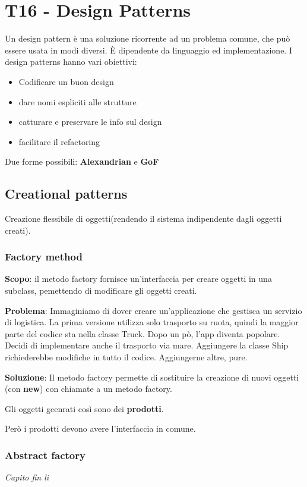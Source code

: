 \documentclass{article}
\begin{document}
\section{T16 - Design Patterns}

Un design pattern è una soluzione ricorrente ad un problema comune, che può essere usata
in modi diversi. È dipendente da linguaggio ed implementazione. I design patterns hanno vari obiettivi:
\begin{itemize}
    \item Codificare un buon design
    \item dare nomi espliciti alle strutture
    \item catturare e preservare le info sul design
    \item facilitare il refactoring
\end{itemize}

Due forme possibili: \textbf{Alexandrian} e \textbf{GoF}
\subsection{Creational patterns}
Creazione flessibile di oggetti(rendendo il sistema indipendente dagli oggetti creati).

\subsubsection{Factory method}
\textbf{Scopo}: il metodo factory fornisce un'interfaccia per creare oggetti
in una subclass, pemettendo di modificare gli oggetti creati.

\textbf{Problema}: Immaginiamo di dover creare un'applicazione che gestisca un servizio di logistica. La prima
versione utilizza solo trasporto su ruota, quindi la maggior parte del codice sta nella classe Truck. Dopo
un pò, l'app diventa popolare. Decidi di implementare anche il trasporto via mare. Aggiungere la classe
Ship richiederebbe modifiche in tutto il codice. Aggiungerne altre, pure.


\textbf{Soluzione}: Il metodo factory permette di sostituire la creazione di nuovi 
oggetti (con \textbf{new}) con chiamate a un metodo factory.

Gli oggetti geenrati così sono dei \textbf{prodotti}.

Però i prodotti devono avere l'interfaccia in comune.

\subsubsection{Abstract factory}
\textit{Capito fin li}
\end{document}

